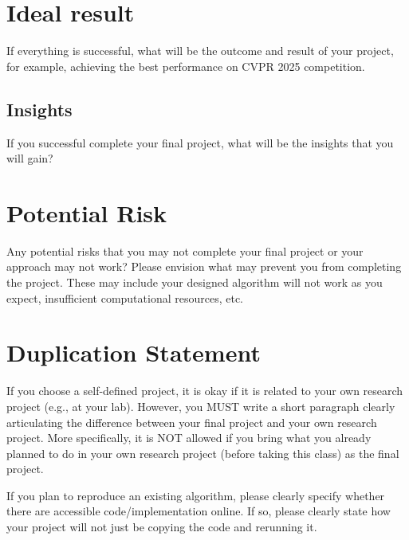 \documentclass{article}
\begin{document}
\section{Ideal result}
{\color{red}
If everything is successful, what will be the outcome and result of your project, for example, achieving the best performance on CVPR 2025 competition.
}

\subsection{Insights}
{\color{red}
If you successful complete your final project, what will be the insights that you will gain?
}

\section{Potential Risk}
{\color{red}
Any potential risks that you may not complete your final project or your approach may not work? Please envision what may prevent you from completing the project. These may include your designed algorithm will not work as you expect, insufficient computational resources, etc. 
}

\section{Duplication Statement}
{\color{red}
If you choose a self-defined project, it is okay if it is related to your own research project (e.g., at your lab). However, you MUST write a short paragraph clearly articulating the difference between your final project and your own research project. More specifically, it is NOT allowed if you bring what you already planned to do in your own research project (before taking this class) as the final project.

If you plan to reproduce an existing algorithm, please clearly specify whether there are accessible code/implementation online. If so, please clearly state how your project will not just be copying the code and rerunning it.
}





\end{document}
